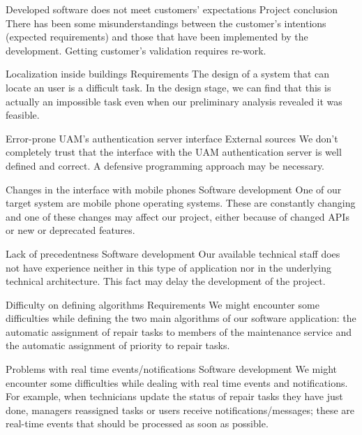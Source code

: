 \begin{risk}{Developed software does not meet customers' expectations}
\riskcat Project conclusion
\riskdesc There has been some misunderstandings between the customer's intentions (expected requirements) and those that have been implemented by the development. Getting customer's validation requires re-work.
\end{risk}

\begin{risk}{Localization inside buildings}
\riskcat Requirements
\riskdesc The design of a system that can locate an user is a difficult task. In the design stage, we can find that this is actually an impossible task even when our preliminary analysis revealed it was feasible.
\end{risk}

\begin{risk}{Error-prone UAM's authentication server interface}
\riskcat External sources
\riskdesc We don't completely trust that the interface with the UAM authentication server is well defined and correct. A defensive programming approach may be necessary.
\end{risk}

\begin{risk}{Changes in the interface with mobile phones}
\riskcat Software development
\riskdesc One of our target system are mobile phone operating systems. These are constantly changing and one of these changes may affect our project, either because of changed APIs or new or deprecated features.
\end{risk}

\begin{risk}{Lack of precedentness}
\riskcat Software development
\riskdesc Our available technical staff does not have experience neither in this type of application nor in the underlying technical architecture. This fact may delay the development of the project.
\end{risk}

\begin{risk}{Difficulty on defining algorithms}
\riskcat Requirements
\riskdesc We might encounter some difficulties while defining the two main algorithms of our software application: the automatic assignment of repair tasks to members of the maintenance service and the automatic assignment of priority to repair tasks.
\end{risk}

\begin{risk}{Problems with real time events/notifications}
\riskcat Software development
\riskdesc We might encounter some difficulties while dealing with real time events and notifications. For example, when technicians update the status of repair tasks they have just done, managers reassigned tasks or users receive notifications/messages; these are real-time events that should be processed as soon as possible.
\end{risk}

